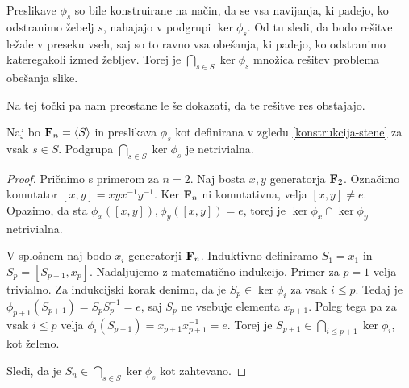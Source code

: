 \documentclass[11pt, a4paper]{article}
\begin{document}
\begin{zgled}
    Preslikave $\phi_s$ so bile konstruirane na način, da se vsa navijanja, ki padejo, ko odstranimo žebelj $s$, nahajajo v podgrupi $\ker \phi_s$. Od tu sledi, da bodo rešitve ležale v preseku vseh, saj so to ravno vsa obešanja, ki padejo, ko odstranimo kateregakoli izmed žebljev. Torej je $\bigcap_{s \in S} \ker \phi_s$ množica rešitev problema obešanja slike.
    \label{konstrukcija-stene}
\end{zgled}


Na tej točki pa nam preostane le še dokazati, da te rešitve res obstajajo.


\begin{izrek}
    Naj bo $\mathbf{F}_n = \langle S \rangle$ in preslikava $\phi_s$ kot definirana v zgledu \ref{konstrukcija-stene} za vsak $s \in S$. Podgrupa $\bigcap_{s \in S} \ker \phi_s$ je netrivialna.
\end{izrek}


\begin{proof}
    Pričnimo s primerom za $n = 2$. Naj bosta $x, y$ generatorja $\mathbf{F}_2$. Označimo komutator $[x, y] = xyx^{-1}y^{-1}$. Ker $\mathbf{F}_n$ ni komutativna, velja $[x, y] \neq e$. Opazimo, da sta $\phi_x([x, y]), \phi_y([x, y]) = e$, torej je $\ker \phi_x \cap \ker \phi_y$ netrivialna.

   V splošnem naj bodo $x_i$ generatorji $\mathbf{F}_n$. Induktivno definiramo $S_1 = x_1$ in $S_p = [S_{p - 1}, x_p]$. Nadaljujemo z matematično indukcijo. Primer za $p = 1$ velja trivialno. Za indukcijski korak denimo, da je $S_p \in \ker \phi_i$ za vsak $i \leq p$. Tedaj je $\phi_{p + 1}(S_{p + 1}) = S_p S_p^{-1} = e$, saj $S_p$ ne vsebuje elementa $x_{p + 1}$. Poleg tega pa za vsak $i \leq p$ velja $\phi_i(S_{p + 1}) = x_{p + 1}x_{p + 1}^{-1} = e$. Torej je $S_{p + 1} \in \bigcap_{i \leq p + 1} \ker \phi_i$, kot želeno.

    Sledi, da je $S_n \in \bigcap_{s \in S} \ker \phi_s$ kot zahtevano.
\end{proof}


\printbibliography
\end{document}

